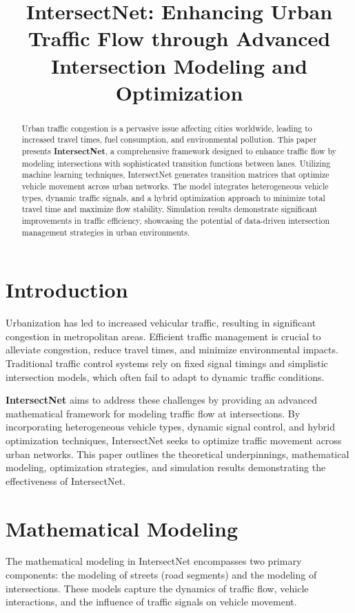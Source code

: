 \documentclass[conference]{IEEEtran}
\title{IntersectNet: Enhancing Urban Traffic Flow through Advanced Intersection Modeling and Optimization}
\author{
    \IEEEauthorblockN{Author Name}
    \IEEEauthorblockA{
        Department of Computer Science \\
        University Name \\
        email@domain.com}
}
\begin{document}
\maketitle

\begin{abstract}
Urban traffic congestion is a pervasive issue affecting cities worldwide, leading to increased travel times, fuel consumption, and environmental pollution. This paper presents \textbf{IntersectNet}, a comprehensive framework designed to enhance traffic flow by modeling intersections with sophisticated transition functions between lanes. Utilizing machine learning techniques, IntersectNet generates transition matrices that optimize vehicle movement across urban networks. The model integrates heterogeneous vehicle types, dynamic traffic signals, and a hybrid optimization approach to minimize total travel time and maximize flow stability. Simulation results demonstrate significant improvements in traffic efficiency, showcasing the potential of data-driven intersection management strategies in urban environments.
\end{abstract}

\IEEEpeerreviewmaketitle

\section{Introduction}
Urbanization has led to increased vehicular traffic, resulting in significant congestion in metropolitan areas. Efficient traffic management is crucial to alleviate congestion, reduce travel times, and minimize environmental impacts. Traditional traffic control systems rely on fixed signal timings and simplistic intersection models, which often fail to adapt to dynamic traffic conditions.

\textbf{IntersectNet} aims to address these challenges by providing an advanced mathematical framework for modeling traffic flow at intersections. By incorporating heterogeneous vehicle types, dynamic signal control, and hybrid optimization techniques, IntersectNet seeks to optimize traffic movement across urban networks. This paper outlines the theoretical underpinnings, mathematical modeling, optimization strategies, and simulation results demonstrating the effectiveness of IntersectNet.

\section{Mathematical Modeling}
The mathematical modeling in IntersectNet encompasses two primary components: the modeling of streets (road segments) and the modeling of intersections. These models capture the dynamics of traffic flow, vehicle interactions, and the influence of traffic signals on vehicle movement.
\end{document}
